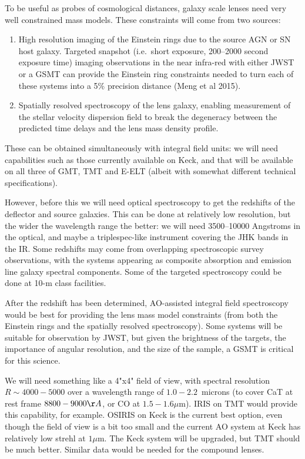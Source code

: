 To be useful as probes of cosmological distances, galaxy scale lenses
need very well constrained mass models. These constraints will come from
two sources:
\begin{enumerate}
\item High resolution imaging of the Einstein rings due to the source AGN
or SN host galaxy. Targeted snapshot (i.e.\ short exposure, 200--2000
second exposure time) imaging
observations in the near infra-red with either JWST or a GSMT
can provide the Einstein ring constraints needed to turn
each of these systems into a  5\% precision distance (Meng et al 2015).
\item Spatially resolved spectroscopy of the lens
galaxy, enabling measurement of the stellar velocity dispersion field to
break the degeneracy between the predicted time delays and the lens mass
density profile.
\end{enumerate}
These can be obtained simultaneously with integral field units: we will
need capabilities such as those currently available on Keck, and that
will be available on all three of GMT, TMT and E-ELT
(albeit with somewhat different technical specifications).

However, before this we will need optical spectroscopy to get the redshifts
of the deflector and source galaxies. This can be done at relatively low
resolution, but the wider the wavelength range the better: we will need
3500--10000 Angstroms in the optical, and maybe a triplespec-like instrument covering the JHK
bands in the IR. Some redshifts may come from overlapping
spectroscopic survey observations, with the systems appearing as
composite absorption and emission line galaxy spectral components. Some
of the targeted spectroscopy could be done at 10-m class facilities.

After the redshift has been determined, AO-assisted integral field
spectroscopy would be best for providing the lens mass model constraints
(from both the Einstein rings and the spatially resolved spectroscopy).
Some systems will be suitable for observation by JWST, but
given the brightness of the targets, the importance of angular
resolution, and the size of the  sample, a GSMT is critical for this
science.

We will need something like a 4"x4" field of view, with
spectral resolution $R\sim4000-5000$ over a wavelength range of $1.0-2.2$~microns
(to cover CaT at rest frame $8800-9000\AA$, or CO at $1.5-1.6\mu$m). IRIS
on TMT would provide this capability, for example. OSIRIS on Keck is the current
best option, even though the field of view is a bit too small and the
current AO system at Keck has relatively low strehl at $1\mu$m. The Keck
system will be upgraded, but TMT should be much better.
Similar data would be needed for the compound lenses.


